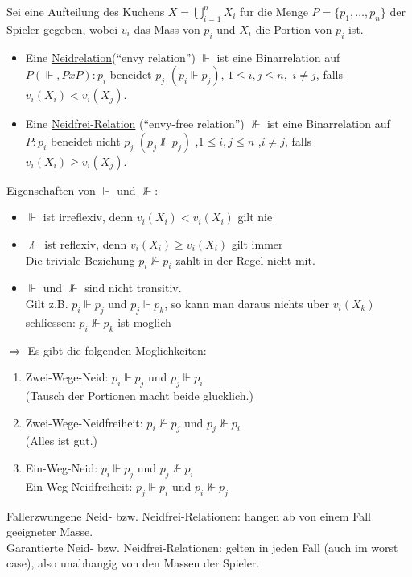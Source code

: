 \begin{defi}
 Sei eine Aufteilung des Kuchens $X=\bigcup\limits_{i=1}^n X_i$ fur die Menge $P=\{p_1,\dots,p_n\}$ der Spieler gegeben, wobei $v_i$
 das Mass von $p_i$ und $X_i$ die Portion von $p_i$ ist.
 \begin{itemize}
  \item Eine \underline{Neidrelation}(``envy relation'') $\Vdash$ ist eine Binarrelation auf $P(\Vdash, PxP):p_i$ beneidet 
        $p_j$ $(p_i\Vdash p_j)$, $1\leq i,j\leq n,$ $i\neq j$, falls $v_i(X_i)<v_i(X_j)$.
  \item Eine \underline{Neidfrei-Relation} (``envy-free relation'') $\nVdash$ ist eine Binarrelation auf $P:p_i$ beneidet nicht $p_j$ $(p_j
        \nVdash p_j)$ ,$1\leq i,j\leq n$ ,$i\neq j$, falls $v_i(X_i)\geq v_i(X_j)$.
 \end{itemize}
\end{defi}
\underline{Eigenschaften von $\Vdash$ und $\nVdash$:}
\begin{itemize}
 \item $\Vdash$ ist irreflexiv, denn $v_i(X_i)<v_i(X_i)$ gilt nie
 \item $\nVdash$ ist reflexiv, denn $v_i(X_i)\geq v_i(X_i)$ gilt immer\\Die triviale Beziehung $p_i \nVdash p_i$ zahlt in der Regel nicht
       mit.
 \item $\Vdash$ und $\nVdash$ sind nicht transitiv.\\
       Gilt z.B. $p_i\Vdash p_j$ und $p_j\Vdash p_k$, so kann man daraus nichts uber $v_i(X_k)$ schliessen: $p_i\nVdash p_k$ ist moglich
\end{itemize}
$\Rightarrow$ Es gibt die folgenden Moglichkeiten:
\begin{enumerate}
 \item Zwei-Wege-Neid: $p_i\Vdash p_j$ und $p_j\Vdash p_i$\\(Tausch der Portionen macht beide glucklich.)
 \item Zwei-Wege-Neidfreiheit: $p_i\nVdash p_j$ und $p_j\nVdash p_i$\\(Alles ist gut.)
 \item Ein-Weg-Neid: $p_i\Vdash p_j$ und $p_j\nVdash p_i$\\
       Ein-Weg-Neidfreiheit: $p_j\Vdash p_i$ und $p_i\nVdash p_j$
\end{enumerate}
Fallerzwungene Neid- bzw. Neidfrei-Relationen: hangen ab von einem Fall geeigneter Masse.\\
Garantierte Neid- bzw. Neidfrei-Relationen: gelten in jeden Fall (auch im worst case), also unabhangig von den Massen der Spieler.\\
